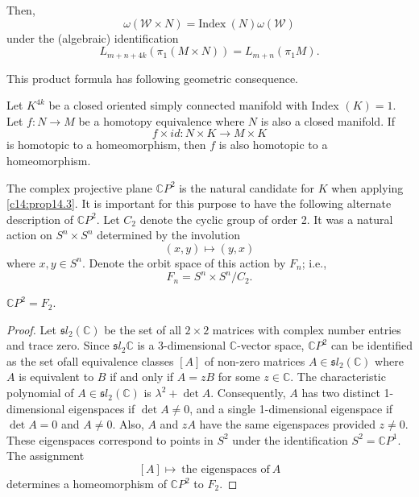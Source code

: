 Then,
$$
\omega (\mathcal{W} \times N)= \text{Index}~ (N) \omega (\mathcal{W})
$$
under the (algebraic) identification
$$
L_{m+n+ 4k} (\pi_1 (M \times N)) = L_{m+n} (\pi_1 M).
$$

This product formula has following geometric consequence.

\begin{prop}\label{c14:prop14.3}
  Let $K^{4k}$ be a closed oriented simply connected manifold with
  Index $(K)=1$. Let $f : N \to M$ be a homotopy equivalence where $N$
  is also a closed manifold. If
  $$
  f \times id: N \times K \to M \times K
  $$
  is homotopic to a homeomorphism, then $f$ is also homotopic to a
  homeomorphism. 
\end{prop}

The complex projective plane $\mathbb{C}P^2$ is the natural candidate
for $K$ when applying \ref{c14:prop14.3}. It is important for this
purpose to have the following alternate description of
$\mathbb{C}P^2$. Let $C_2$ denote the cyclic group of order 2. It was
a natural action on $S^n \times S^n$ determined by
the involution
$$
(x, y) \mapsto (y, x)
$$
where $x, y \in {S}^n$. Denote the orbit space of this action
by $F_n$; i.e.,
$$
F_n = {S}^n \times {S}^n /C_2.
$$

\begin{lemma}\label{c14:lem14.4}
  $\mathbb{C} P^2 = F_2$.
\end{lemma}

\begin{proof}
  Let $\mathfrak{s}l_2 (\mathbb{C})$ be the set of all $2 \times 2$
  matrices with 
  complex number entries and trace zero. Since $\mathfrak{s}l_2\mathbb{C}$ is a
  3-dimensional $\mathbb{C}$-vector space, $\mathbb{C}P^2$ can be
  identified as the set of\pageoriginale all equivalence classes $[A]$
  of non-zero matrices $A \in \mathfrak{s}l_2 (\mathbb{C})$ where $A$
  is equivalent to $B$ if and only if $A= z B$ for some $z \in
  \mathbb{C}$. The characteristic polynomial of $A \in \mathfrak{s}
  l_2 (\mathbb{C})$ is $\lambda^2+ \det A$. Consequently, $A$ has
  two distinct 1-dimensional eigenspaces if $\det A \neq 0$, and a
  single 1-dimensional eigenspace if $\det A = 0$ and $A \neq
  0$. Also, $A$ and $z A$ have the same eigenspaces provided $z \neq
  0$. These eigenspaces correspond to points in $S^2$ under the
  identification $S^2 = \mathbb{C}P^1$. The assignment
  $$
  [A] \mapsto ~\text{the eigenspaces of}~ A
  $$
  determines a homeomorphism of $\mathbb{C}P^2$ to $F_2$.
\end{proof}

